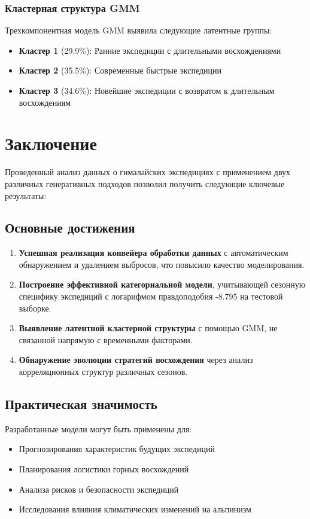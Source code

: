 \documentclass[12pt, a4paper]{article}
\begin{document}
\subsubsection{Кластерная структура GMM}
Трехкомпонентная модель GMM выявила следующие латентные группы:
\begin{itemize}
    \item \textbf{Кластер 1} (29.9\%): Ранние экспедиции с длительными восхождениями
    \item \textbf{Кластер 2} (35.5\%): Современные быстрые экспедиции
    \item \textbf{Кластер 3} (34.6\%): Новейшие экспедиции с возвратом к длительным восхождениям
\end{itemize}

\section{Заключение}
Проведенный анализ данных о гималайских экспедициях с применением двух различных генеративных подходов позволил получить следующие ключевые результаты:

\subsection{Основные достижения}
\begin{enumerate}
    \item \textbf{Успешная реализация конвейера обработки данных} с автоматическим обнаружением и удалением выбросов, что повысило качество моделирования.
    
    \item \textbf{Построение эффективной категориальной модели}, учитывающей сезонную специфику экспедиций с логарифмом правдоподобия -8.795 на тестовой выборке.
    
    \item \textbf{Выявление латентной кластерной структуры} с помощью GMM, не связанной напрямую с временными факторами.
    
    \item \textbf{Обнаружение эволюции стратегий восхождения} через анализ корреляционных структур различных сезонов.
\end{enumerate}

\subsection{Практическая значимость}
Разработанные модели могут быть применены для:
\begin{itemize}
    \item Прогнозирования характеристик будущих экспедиций
    \item Планирования логистики горных восхождений
    \item Анализа рисков и безопасности экспедиций
    \item Исследования влияния климатических изменений на альпинизм
\end{itemize}
\end{document}
